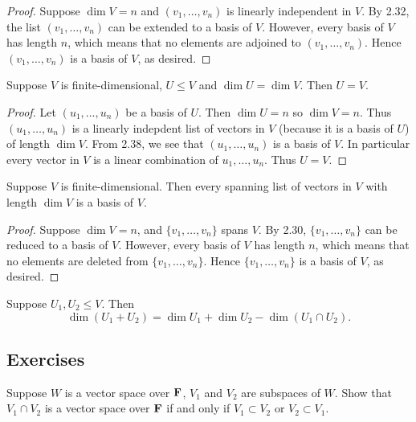 \begin{proof}
Suppose $\dim V=n$ and $(v_1,\dots,v_n)$ is linearly independent in $V$. By 2.32, the list $(v_1,\dots,v_n)$ can be extended to a basis of $V$. However, every basis of $V$ has length $n$, which means that no elements are adjoined to $(v_1,\dots,v_n)$. Hence $(v_1,\dots,v_n)$ is a basis of $V$, as desired.
\end{proof}

\begin{proposition}
Suppose $V$ is finite-dimensional, $U\le V$ and $\dim U=\dim V$. Then $U=V$.
\end{proposition}

\begin{proof}
Let $(u_1,\dots,u_n)$ be a basis of $U$. Then $\dim U=n$ so $\dim V=n$. Thus $(u_1,\dots,u_n)$ is a linearly indepdent list of vectors in $V$ (because it is a basis of $U$) of length $\dim V$. From 2.38, we see that $(u_1,\dots,u_n)$ is a basis of $V$. In particular every vector in $V$ is a linear combination of $u_1,\dots,u_n$. Thus $U=V$.
\end{proof}

\begin{proposition}
Suppose $V$ is finite-dimensional. Then every spanning list of vectors in $V$ with length $\dim V$ is a basis of $V$.
\end{proposition}

\begin{proof}
Suppose $\dim V=n$, and $\{v_1,\dots,v_n\}$ spans $V$. By 2.30, $\{v_1,\dots,v_n\}$ can be reduced to a basis of $V$. However, every basis of $V$ has length $n$, which means that no elements are deleted from $\{v_1,\dots,v_n\}$. Hence $\{v_1,\dots,v_n\}$ is a basis of $V$, as desired.
\end{proof}

\begin{lemma}
Suppose $U_1,U_2\le V$. Then
\[\dim(U_1+U_2)=\dim U_1+\dim U_2-\dim(U_1\cap U_2).\]
\end{lemma}
\pagebreak

\subsection*{Exercises}
\begin{prbm}
Suppose $W$ is a vector space over $\mathbf F$, $V_1$ and $V_2$ are subspaces of $W$. Show that $V_1\cap V_2$ is a vector space over $\mathbf F$ if and only if $V_1\subset V_2$ or $V_2\subset V_1$.
\end{prbm}

